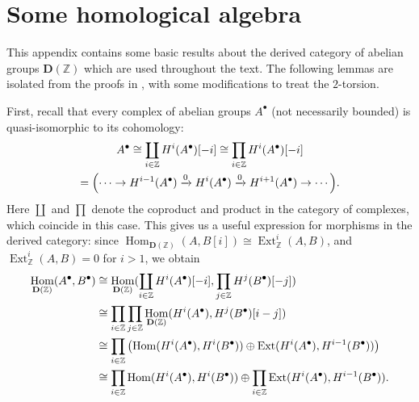 \documentclass[leqno,12pt]{article}
\theoremstyle{plain}
\theoremstyle{definition}
\DeclareMathOperator{\Hom}{Hom}
\DeclareMathOperator{\Ext}{Ext}
\newcommand{\ZZ}{\mathbb{Z}}
\newcommand{\DZ}{{\mathbf{D} (\ZZ)}}
\begin{document}

\pagebreak
\appendix
\section{Some homological algebra}
\label{app:homological-algebra}

This appendix contains some basic results about the derived category of abelian
groups $\DZ$ which are used throughout the text. The following lemmas are
isolated from the proofs in \cite{Flach-Morin-2018}, with some modifications to
treat the $2$-torsion.

First, recall that every complex of abelian groups $A^\bullet$ (not necessarily
bounded) is quasi-isomorphic to its cohomology:
\begin{multline*}
  A^\bullet \cong \coprod_{i\in \ZZ} H^i (A^\bullet) [-i] \cong
  \prod_{i\in \ZZ} H^i (A^\bullet) [-i] \\
  = \Bigl(\cdots \to H^{i-1} (A^\bullet) \xrightarrow{0} H^i (A^\bullet)
  \xrightarrow{0} H^{i+1} (A^\bullet) \to \cdots\Bigr).
\end{multline*}
Here $\coprod$ and $\prod$ denote the coproduct and product in the category of
complexes, which coincide in this case. This gives us a useful expression for
morphisms in the derived category: since
$\Hom_\DZ (A,B [i]) \cong \Ext_\ZZ^i (A,B)$, and $\Ext_\ZZ^i (A,B) = 0$ for
$i > 1$, we obtain
\begin{align}
  \notag \Hom_\DZ (A^\bullet, B^\bullet) & \cong \Hom_\DZ (\coprod_{i\in\ZZ} H^i (A^\bullet) [-i], \prod_{j\in\ZZ} H^j (B^\bullet) [-j]) \\
  \notag & \cong \prod_{i\in \ZZ} \prod_{j\in \ZZ} \Hom_\DZ (H^i (A^\bullet), H^j (B^\bullet) [i-j]) \\
  \notag & \cong \prod_{i\in \ZZ} \left(\Hom (H^i (A^\bullet), H^i (B^\bullet)) \oplus \Ext (H^i (A^\bullet), H^{i-1} (B^\bullet))\right) \\
           \label{eqn:morphisms-in-D(Z)} & \cong \prod_{i\in \ZZ} \Hom (H^i (A^\bullet), H^i (B^\bullet)) \oplus \prod_{i\in \ZZ} \Ext (H^i (A^\bullet), H^{i-1} (B^\bullet)).
\end{align}
\end{document}

